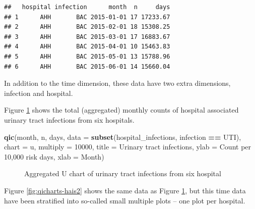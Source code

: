 \documentclass[
]{book}
\makeatletter
\newenvironment{Shaded}{\begin{snugshade}}{\end{snugshade}}
\newcommand{\AttributeTok}[1]{\textcolor[rgb]{0.13,0.29,0.53}{#1}}
\newcommand{\DecValTok}[1]{\textcolor[rgb]{0.00,0.00,0.81}{#1}}
\newcommand{\FunctionTok}[1]{\textcolor[rgb]{0.13,0.29,0.53}{\textbf{#1}}}
\newcommand{\NormalTok}[1]{#1}
\newcommand{\SpecialCharTok}[1]{\textcolor[rgb]{0.81,0.36,0.00}{\textbf{#1}}}
\newcommand{\StringTok}[1]{\textcolor[rgb]{0.31,0.60,0.02}{#1}}
\newcommand*\pandocbounded[1]{%
  \sbox\pandoc@box{#1}%
  \Gscale@div\@tempa{\textheight}{\dimexpr\ht\pandoc@box+\dp\pandoc@box\relax}%
  \Gscale@div\@tempb{\linewidth}{\wd\pandoc@box}%
  \ifdim\@tempb\p@<\@tempa\p@\let\@tempa\@tempb\fi%
  \ifdim\@tempa\p@<\p@\scalebox{\@tempa}{\usebox\pandoc@box}%
  \else\usebox{\pandoc@box}%
  \fi%
}
\makeatother
\begin{document}
\begin{verbatim}
##   hospital infection      month  n     days
## 1      AHH       BAC 2015-01-01 17 17233.67
## 2      AHH       BAC 2015-02-01 18 15308.25
## 3      AHH       BAC 2015-03-01 17 16883.67
## 4      AHH       BAC 2015-04-01 10 15463.83
## 5      AHH       BAC 2015-05-01 13 15788.96
## 6      AHH       BAC 2015-06-01 14 15660.04
\end{verbatim}

In addition to the time dimension, these data have two extra dimensions, infection and hospital.

Figure \ref{fig:qicharts-hais1} shows the total (aggregated) monthly counts of hospital associated urinary tract infections from six hospitals.

\begin{Shaded}
\begin{Highlighting}[]
\FunctionTok{qic}\NormalTok{(month, n, days, }
    \AttributeTok{data     =} \FunctionTok{subset}\NormalTok{(hospital\_infections,}
\NormalTok{                      infection }\SpecialCharTok{==} \StringTok{\textquotesingle{}UTI\textquotesingle{}}\NormalTok{),}
    \AttributeTok{chart    =} \StringTok{\textquotesingle{}u\textquotesingle{}}\NormalTok{,}
    \AttributeTok{multiply =} \DecValTok{10000}\NormalTok{,}
    \AttributeTok{title    =} \StringTok{\textquotesingle{}Urinary tract infections\textquotesingle{}}\NormalTok{,}
    \AttributeTok{ylab     =} \StringTok{\textquotesingle{}Count per 10,000 risk days\textquotesingle{}}\NormalTok{,}
    \AttributeTok{xlab     =} \StringTok{\textquotesingle{}Month\textquotesingle{}}\NormalTok{)}
\end{Highlighting}
\end{Shaded}

\begin{figure}
\centering
\pandocbounded{}
\caption{\label{fig:qicharts-hais1}Aggregated U chart of urinary tract infections from six hospital}
\end{figure}

Figure \ref{fig:qicharts-hais2} shows the same data as Figure \ref{fig:qicharts-hais1}, but this time data have been stratified into so-called small multiple plots -- one plot per hospital.
\end{document}
